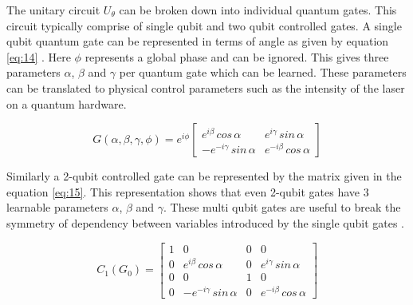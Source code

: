 \documentclass[english,a4paper,11pt,oneside,onecolumn]{book}
\begin{document}
The unitary circuit \(U_\theta\) can be broken down into individual quantum gates. This circuit typically comprise of single qubit and two qubit controlled gates. A single qubit quantum gate can be represented in terms of angle as given by equation \ref{eq:14} \cite{schuld_2020_circuitcentric}. Here \(\phi\) represents a global phase and can be ignored. This gives three parameters \(\alpha\), \(\beta\) and \(\gamma\) per quantum gate which can be learned. These parameters can be translated to physical control parameters such as the intensity of the laser on a quantum hardware.

\begin{equation}\label{eq:14}
G(\alpha, \beta, \gamma, \phi) = e^{i\phi}
\begin{bmatrix}
e^{i\beta}\hspace{2pt}cos\hspace{2pt}\alpha & e^{i\gamma}\hspace{2pt}sin\hspace{2pt}\alpha\\
-e^{-i\gamma}\hspace{2pt}sin\hspace{2pt}\alpha & e^{-i\beta}\hspace{2pt}cos\hspace{2pt}\alpha
\end{bmatrix}
\end{equation}

Similarly a 2-qubit controlled gate can be represented by the matrix given in the equation \ref{eq:15}. This representation shows that even 2-qubit gates have 3 learnable parameters \(\alpha\), \(\beta\) and \(\gamma\). These multi qubit gates are useful to break the symmetry of dependency between variables introduced by the single qubit gates \cite{schuld_2020_circuitcentric}. 

\begin{equation}\label{eq:15}
C_1(G_0) = \begin{bmatrix}
1 & 0 & 0 & 0\\
0 & e^{i\beta}\hspace{2pt}cos\hspace{2pt}\alpha & 0 & e^{i\gamma}\hspace{2pt}sin\hspace{2pt}\alpha\\
0 & 0 & 1 & 0\\
0 & -e^{-i\gamma}\hspace{2pt}sin\hspace{2pt}\alpha & 0 & e^{-i\beta}\hspace{2pt}cos\hspace{2pt}\alpha
\end{bmatrix}
\end{equation}
\end{document}
